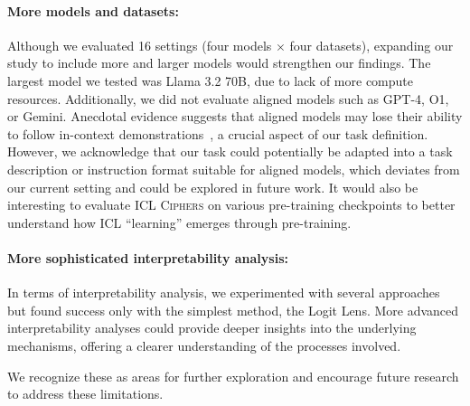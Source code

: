 \documentclass[11pt]{article}
\newcommand{\name}{\textsc{ICL Ciphers}}
\begin{document}
\paragraph{More models and datasets:}
Although we evaluated 16 settings (four models $\times$ four datasets), expanding our study to include more and larger models would strengthen our findings. The largest model we tested was Llama 3.2 70B, due to lack of more compute resources. Additionally, we did not evaluate aligned models such as GPT-4, O1, or Gemini. Anecdotal evidence suggests that aligned models may lose their ability to follow in-context demonstrations~\cite{fu2022does}, a crucial aspect of our task definition. However, we acknowledge that our task could potentially be adapted into a task description or instruction format suitable for aligned models, which deviates from our current setting and could be explored in future work. It would also be interesting to evaluate \name{} on various pre-training checkpoints to better understand how ICL ``learning'' emerges through pre-training.

\paragraph{More sophisticated interpretability analysis:}
In terms of interpretability analysis, we experimented with several approaches but found success only with the simplest method, the Logit Lens. More advanced interpretability analyses could provide deeper insights into the underlying mechanisms, offering a clearer understanding of the processes involved.

We recognize these as areas for further exploration and encourage future research to address these limitations.





\end{document}
